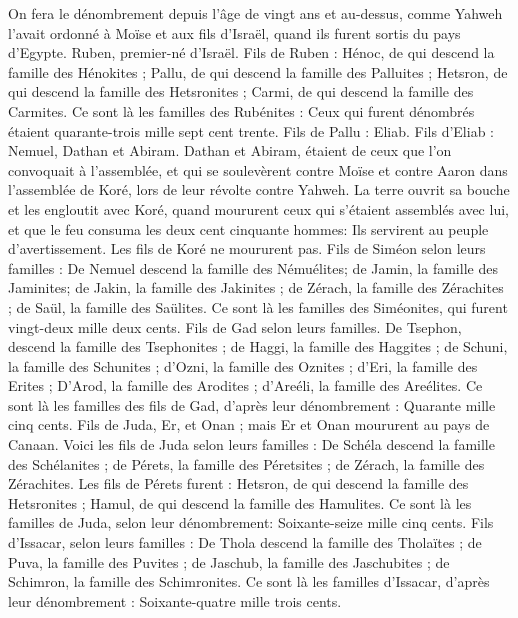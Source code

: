 \begin{multicols}{2}
On fera le dénombrement depuis l'âge de vingt ans et au-dessus, comme Yahweh l'avait ordonné à Moïse et aux fils d'Israël, quand ils furent sortis du pays d'Egypte.
Ruben, premier-né d'Israël. Fils de Ruben : Hénoc, de qui descend la famille des Hénokites ; Pallu, de qui descend la famille des Palluites ;
Hetsron, de qui descend la famille des Hetsronites ; Carmi, de qui descend la famille des Carmites.
Ce sont là les familles des Rubénites : Ceux qui furent dénombrés étaient quarante-trois mille sept cent trente.
Fils de Pallu : Eliab.
Fils d'Eliab : Nemuel, Dathan et Abiram. Dathan et Abiram, étaient de ceux que l'on convoquait à l'assemblée, et qui se soulevèrent contre Moïse et contre Aaron dans l'assemblée de Koré, lors de leur révolte contre Yahweh.
La terre ouvrit sa bouche et les engloutit avec Koré, quand moururent ceux qui s’étaient assemblés avec lui, et que le feu consuma les deux cent cinquante hommes: Ils servirent au peuple d’avertissement.
Les fils de Koré ne moururent pas.
Fils de Siméon selon leurs familles : De Nemuel descend la famille des Némuélites; de Jamin, la famille des Jaminites; de Jakin, la famille des Jakinites ;
de Zérach, la famille des Zérachites ; de Saül, la famille des Saülites.
Ce sont là les familles des Siméonites, qui furent vingt-deux mille deux cents.
Fils de Gad selon leurs familles. De Tsephon, descend la famille des Tsephonites ; de Haggi, la famille des Haggites ; de Schuni, la famille des Schunites ;
d'Ozni, la famille des Oznites ; d’Eri, la famille des Erites ;
D'Arod, la famille des Arodites ; d'Areéli, la famille des Areélites.
Ce sont là les familles des fils de Gad, d’après leur dénombrement : Quarante mille cinq cents.
Fils de Juda, Er, et Onan ; mais Er et Onan moururent au pays de Canaan.
Voici les fils de Juda selon leurs familles : De Schéla descend la famille des Schélanites ; de Pérets, la famille des Péretsites ; de Zérach, la famille des Zérachites.
Les fils de Pérets furent : Hetsron, de qui descend la famille des Hetsronites ; Hamul, de qui descend la famille des Hamulites.
Ce sont là les familles de Juda, selon leur dénombrement: Soixante-seize mille cinq cents.
Fils d'Issacar, selon leurs familles : De Thola descend la famille des Tholaïtes ; de Puva, la famille des Puvites ;
de Jaschub, la famille des Jaschubites ; de Schimron, la famille des Schimronites.
Ce sont là les familles d'Issacar, d’après leur dénombrement : Soixante-quatre mille trois cents.

\end{multicols}
